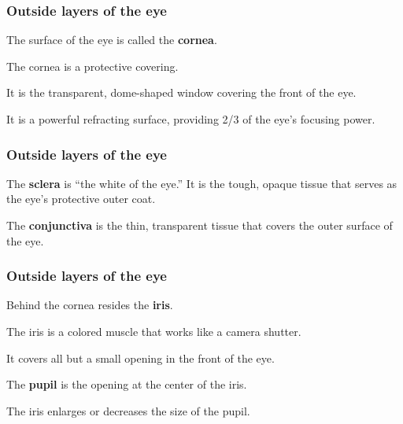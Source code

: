 \documentclass[12pt]{beamer}\usepackage[]{graphicx}\usepackage[]{color}
\begin{document}
\begin{frame}
\begin{center}
\end{center}
\end{frame}


\begin{frame}
\frametitle{Outside layers of the eye}

\bbi
  \item The surface of the eye is called the \textbf{cornea}.
  \item The cornea is a protective covering.
  \item It is the transparent, dome-shaped window covering
  the front of the eye. 
  \item It is a powerful refracting surface, providing 2/3
  of the eye's focusing power.
\ei
\eb

\end{frame}


\begin{frame}
\frametitle{Outside layers of the eye}

\bbi
  \item The \textbf{sclera} is ``the white of the eye.'' It is the tough, 
  opaque tissue that serves as the eye's protective outer coat.
  \item The \textbf{conjunctiva} is the thin, transparent tissue that covers
  the outer surface of the eye.
\ei
\eb

\end{frame}


\begin{frame}
\begin{center}
\end{center}
\end{frame}


\begin{frame}
\frametitle{Outside layers of the eye}

\bbi
  \item Behind the cornea resides the \textbf{iris}.
  \item The iris is a colored muscle that works like a camera shutter.
  \item It covers all but a small opening in the front of the eye.
  \item The \textbf{pupil} is the opening at the center of the iris.
  \item The iris enlarges or decreases the size of the pupil.
\ei
\eb

\end{frame}
\end{document}
